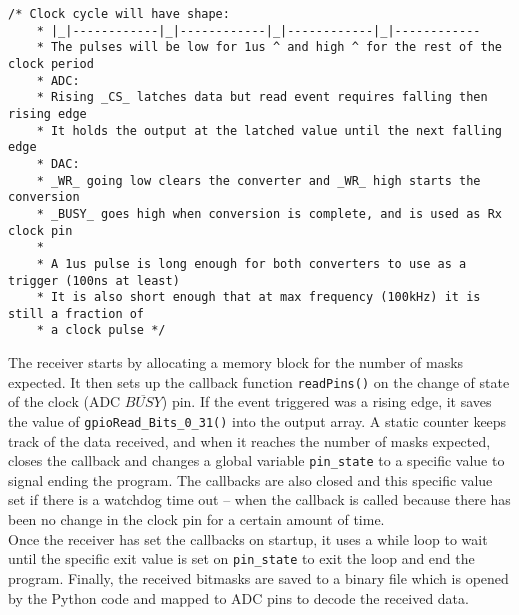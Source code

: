 \documentclass[../main.tex]{subfiles}
\begin{document}
\lstset{style=C}
\begin{lstlisting}[caption={Transmitter documentation explaining the clock signal}, label={lst_Transmitter Docs}, basicstyle=\footnotesize]
	/* Clock cycle will have shape:
	* |_|------------|_|------------|_|------------|_|------------
	* The pulses will be low for 1us ^ and high ^ for the rest of the clock period
	* ADC:
	* Rising _CS_ latches data but read event requires falling then rising edge
	* It holds the output at the latched value until the next falling edge
	* DAC:
	* _WR_ going low clears the converter and _WR_ high starts the conversion
	* _BUSY_ goes high when conversion is complete, and is used as Rx clock pin
	*
	* A 1us pulse is long enough for both converters to use as a trigger (100ns at least)
	* It is also short enough that at max frequency (100kHz) it is still a fraction of
	* a clock pulse	*/
\end{lstlisting}

The receiver starts by allocating a memory block for the number of masks expected.
It then sets up the callback function \colorbox{backcolour}{\lstinline{readPins()}} on the change of state of the clock (ADC $\overline{BUSY}$) pin.
If the event triggered was a rising edge, it saves the value of \colorbox{backcolour}{\lstinline{gpioRead_Bits_0_31()}} into the output array.
A static counter keeps track of the data received, and when it reaches the number of masks expected, closes the callback and changes a global variable \colorbox{backcolour}{\lstinline{pin_state}} to a specific value to signal ending the program.
The callbacks are also closed and this specific value set if there is a watchdog time out -- when the callback is called because there has been no change in the clock pin for a certain amount of time.\\

Once the receiver has set the callbacks on startup, it uses a while loop to wait until the specific exit value is set on \colorbox{backcolour}{\lstinline{pin_state}} to exit the loop and end the program.
Finally, the received bitmasks are saved to a binary file which is opened by the Python code and mapped to ADC pins to decode the received data. 
\end{document}
